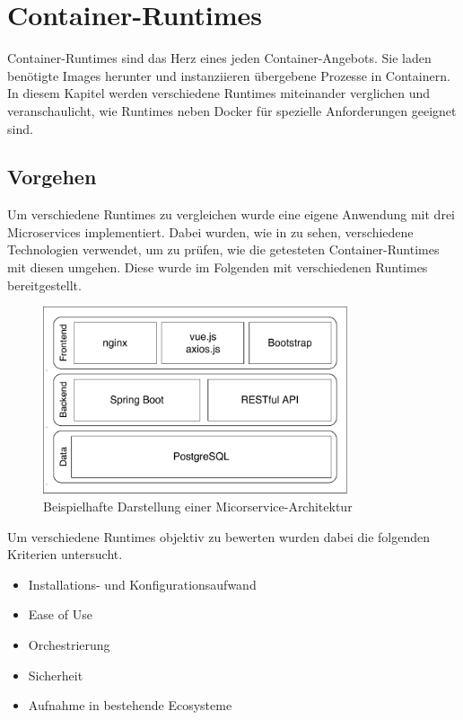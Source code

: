 \chapter{Container-Runtimes}
\label{chap:compCtnrRuntimes}

Container-Runtimes sind das Herz eines jeden Container-Angebots. Sie laden benötigte Images herunter und instanziieren übergebene Prozesse in Containern. In diesem Kapitel werden verschiedene Runtimes miteinander verglichen und veranschaulicht, wie Runtimes neben Docker für spezielle Anforderungen geeignet sind.

\section{Vorgehen}
\label{sec:vorgehen}
Um verschiedene Runtimes zu vergleichen wurde eine eigene Anwendung mit drei Microservices implementiert. Dabei wurden, wie in  zu sehen, verschiedene Technologien verwendet, um zu prüfen, wie die getesteten Container-Runtimes mit diesen umgehen. Diese wurde im Folgenden mit verschiedenen Runtimes bereitgestellt.

\begin{figure}[h]
	\begin{center}
		\includegraphics[width=0.8\textwidth]{bilder/microservice-example-stack.pdf}
		\caption{Beispielhafte Darstellung einer Micorservice-Architektur}
		\label{fig:todosStack}
	\end{center}
\end{figure}

Um verschiedene Runtimes objektiv zu bewerten wurden dabei die folgenden Kriterien untersucht.
\begin{itemize}
	\item Installations- und Konfigurationsaufwand
	\item Ease of Use
	\item Orchestrierung
	\item Sicherheit
	\item Aufnahme in bestehende Ecosysteme
\end{itemize}

